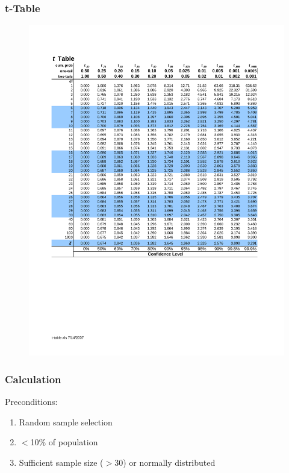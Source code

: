 \documentclass[12pt]{article}
\numberwithin{equation}{section}
\begin{document}
\subsubsection{t-Table}
\begin{figure}[!ht]
    \centering
    \includegraphics[width=\linewidth, clip, trim=2cm 8cm 2cm 2.5cm]{t-table.pdf}
    \label{fig:t_table}
\end{figure}
\vspace{-1cm}

\subsubsection{Calculation}
Preconditions:
\begin{enumerate}
    \item Random sample selection
    \item $<$10\% of population
    \item Sufficient sample size ($>$30) or normally distributed
\end{enumerate}
\end{document}
